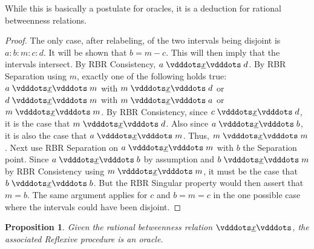 \documentclass[12pt]{article}
\newtheorem{proposition}{Proposition}[section]
\begin{document}
While this is basically a postulate for oracles, it is a deduction for rational betweenness relations. 

\begin{proof}
    The only case, after relabeling, of the two intervals being disjoint is $a:b:m:c:d$. It will be shown that $b =m - c$. This will then imply that the intervals intersect. By RBR Consistency, $a \xrel d$. By RBR Separation using $m$, exactly one of the following holds true: $a \xrel m$ with \sout{$m \xrel d$} or $d \xrel m$ with \sout{$m \xrel a$} or $m \xrel m$. By RBR Consistency, since $c \xrel d$, it is the case that $m \xrel d$. Also since $a \xrel b$, it is also the case that $a \xrel m$. Thus, $m \xrel m$. Next use RBR Separation on $a \xrel m$ with $b$ the Separation point. Since $a \xrel b$ by assumption and $b \xrel m$ by RBR Consistency using $m \xrel m$, it must be the case that $b \xrel b$. But the RBR Singular property would then assert that $m = b$. The same argument applies for $c$ and $b = m = c$ in the one possible case where the intervals could have been disjoint. 
\end{proof}

\begin{proposition}
    Given the rational betweenness relation $\xrel$, the associated Reflexive procedure is an oracle. 
\end{proposition}
\end{document}
